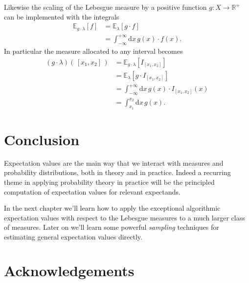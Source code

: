 \documentclass[
  letterpaper,
  DIV=11,
  numbers=noendperiod]{scrartcl}
\begin{document}
Likewise the scaling of the Lebesgue measure by a positive function
\(g : X \rightarrow \mathbb{R}^{+}\) can be implemented with the
integrals \begin{align*}
\mathbb{E}_{g \cdot \lambda}[f]
&=
\mathbb{E}_{\lambda}[g \cdot f]
\\
&=
\int_{-\infty}^{+\infty} \mathrm{d} x \, g(x) \cdot f(x).
\end{align*} In particular the measure allocated to any interval becomes
\begin{align*}
(g \cdot \lambda) ( \, [x_{1}, x_{2} ] \, )
&=
\mathbb{E}_{g \cdot \lambda}[ I_{ [x_{1}, x_{2}] } ]
\\
&=
\mathbb{E}_{\lambda}[ g \cdot I_{ [x_{1}, x_{2}] } ]
\\
&=
\int_{-\infty}^{+\infty}
\mathrm{d} x \, g(x) \cdot I_{ [x_{1}, x_{2}] }(x)
\\
&=
\int_{x_{1}}^{x_{2}} \mathrm{d} x \, g(x).
\end{align*}

\hypertarget{conclusion}{%
\section{Conclusion}\label{conclusion}}

Expectation values are the main way that we interact with measures and
probability distributions, both in theory and in practice. Indeed a
recurring theme in applying probability theory in practice will be the
principled computation of expectation values for relevant expectands.

In the next chapter we'll learn how to apply the exceptional algorithmic
expectation values with respect to the Lebesgue measures to a much
larger class of measures. Later on we'll learn some powerful
\emph{sampling} techniques for estimating general expectation values
directly.

\hypertarget{acknowledgements}{%
\section*{Acknowledgements}\label{acknowledgements}}
\end{document}
